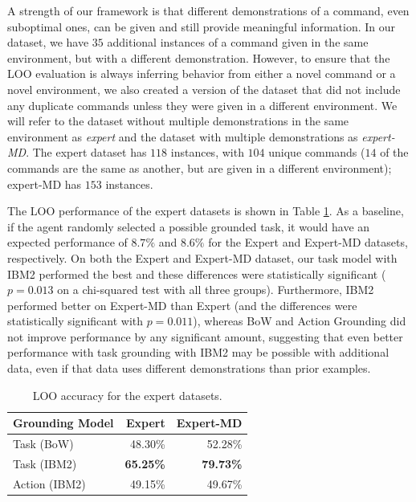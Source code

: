 \documentclass[conference]{IEEEtran}
\begin{document}
A strength of our framework is that different demonstrations of a command, even suboptimal ones, can be given and still provide meaningful information. In our dataset, we have $35$ additional instances of a command given in the same environment, but with a different demonstration. However, to ensure that the LOO evaluation is always inferring behavior from either a novel command or a novel environment, we also created a version of the dataset that did not include any duplicate commands unless they were given in a different environment. We will refer to the dataset without multiple demonstrations in the same environment as {\em expert} and the dataset with multiple demonstrations as {\em expert-MD}. The expert dataset has $118$ instances, with $104$ unique commands ($14$ of the commands are the same as another, but are given in a different environment); expert-MD has $153$ instances. %

The LOO performance of the expert datasets is shown in Table \ref{tab:res_e}. As a baseline, if the agent randomly selected a possible grounded task, it would have an expected performance of $8.7\%$ and $8.6\%$ for the Expert and Expert-MD datasets, respectively. On both the Expert and Expert-MD dataset, our task model with IBM2 performed the best and these differences were statistically significant ($p = 0.013$ on a chi-squared test with all three groups). Furthermore, IBM2 performed better on Expert-MD than Expert (and the differences were statistically significant with $p = 0.011$), whereas BoW and Action Grounding did not improve performance by any significant amount, suggesting that even better performance with task grounding with IBM2 may be possible with additional data, even if that data uses different demonstrations than prior examples. 


\begin{table}[tb]
\begin{center}
\begin{tabular}{@{}lrr@{}} \toprule
Grounding Model & Expert & Expert-MD \\ \midrule
Task (BoW) & 48.30\% & 52.28\% \\ 
Task (IBM2) & {\bf 65.25\%} & {\bf 79.73\%}  \\ 
Action (IBM2) & 49.15\% & 49.67\% \\ \bottomrule
\hline
 \end{tabular} 
 \caption{\small LOO accuracy for the expert datasets.}
 \label{tab:res_e}
\end{center}
\end{table}
\end{document}
